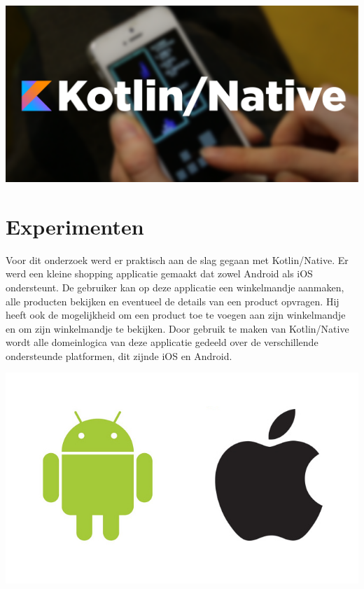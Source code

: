 \documentclass[a0,portrait]{a0poster}
\begin{document}
\begin{multicols}{2}
\begin{center}\vspace{1cm}
	\includegraphics[width=1.0\linewidth]{figures/kn.png}
\end{center}\vspace{1cm}

\color{Black} %
\color{HoGentAccent1} 
\section*{Experimenten}
\color{black}
Voor dit onderzoek werd er praktisch aan de slag gegaan met Kotlin/Native. Er werd een kleine shopping applicatie gemaakt dat zowel Android als iOS ondersteunt. De gebruiker kan op deze applicatie een winkelmandje aanmaken, alle producten bekijken en eventueel de details van een product opvragen. Hij heeft ook de mogelijkheid om een product toe te voegen aan zijn winkelmandje en om zijn winkelmandje te bekijken. Door gebruik te maken van Kotlin/Native wordt alle domeinlogica van deze applicatie gedeeld over de verschillende ondersteunde platformen, dit zijnde iOS en Android.

\begin{center}\vspace{1cm}
	\includegraphics[width=0.8\linewidth]{figures/apple-android.jpeg}
\end{center}\vspace{1cm}


\end{multicols}
\end{document}
